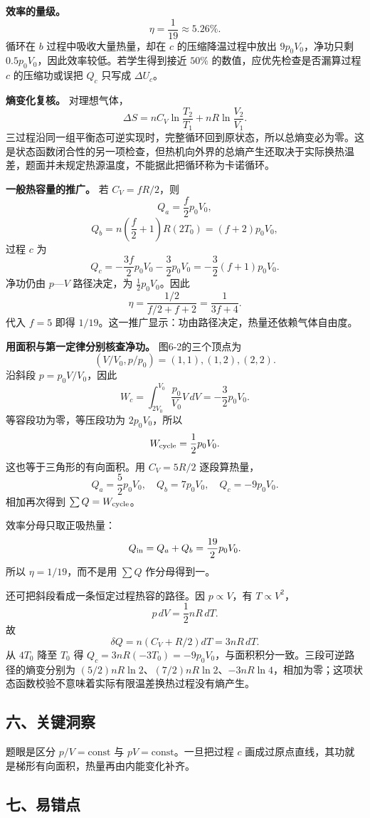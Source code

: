 \documentclass[12pt,a4paper,UTF8]{ctexart}
\begin{document}
\textbf{效率的量级。} \[
\eta=\frac1{19}\approx5.26\%.
\] 循环在 \(b\) 过程中吸收大量热量，却在 \(c\) 的压缩降温过程中放出
\(9p_0V_0\)，净功只剩 \(0.5p_0V_0\)，因此效率较低。若学生得到接近
\(50\%\) 的数值，应优先检查是否漏算过程 \(c\) 的压缩功或误把 \(Q_c\)
只写成 \(\Delta U_c\)。

\textbf{熵变化复核。} 对理想气体， \[
\Delta S=nC_V\ln\frac{T_2}{T_1}
+nR\ln\frac{V_2}{V_1}.
\]
三过程沿同一组平衡态可逆实现时，完整循环回到原状态，所以总熵变必为零。这是状态函数闭合性的另一项检查，但热机向外界的总熵产生还取决于实际换热温差，题面并未规定热源温度，不能据此把循环称为卡诺循环。

\textbf{一般热容量的推广。} 若 \(C_V=fR/2\)，则 \[
Q_a=\frac f2p_0V_0,
\] \[
Q_b=n\left(\frac f2+1\right)R(2T_0)
=(f+2)p_0V_0,
\] 过程 \(c\) 为 \[
Q_c=-\frac{3f}{2}p_0V_0-\frac32p_0V_0
=-\frac32(f+1)p_0V_0.
\] 净功仍由 \(p\)---\(V\) 路径决定，为 \(\tfrac12p_0V_0\)。因此 \[
\eta
=\frac{1/2}{f/2+f+2}
=\frac1{3f+4}.
\] 代入 \(f=5\) 即得
\(1/19\)。这一推广显示：功由路径决定，热量还依赖气体自由度。

\textbf{用面积与第一定律分别核查净功。} 图6-2的三个顶点为 \[
(V/V_0,p/p_0)=(1,1),(1,2),(2,2).
\] 沿斜段 \(p=p_0V/V_0\)，因此 \[
W_c=\int_{2V_0}^{V_0}\frac{p_0}{V_0}V\,dV=-\frac32p_0V_0.
\] 等容段功为零，等压段功为 \(2p_0V_0\)，所以 \[
W_{\rm cycle}=\frac12p_0V_0.
\] 这也等于三角形的有向面积。用 \(C_V=5R/2\) 逐段算热量， \[
Q_a=\frac52p_0V_0,\quad Q_b=7p_0V_0,\quad Q_c=-9p_0V_0.
\] 相加再次得到 \(\sum Q=W_{\rm cycle}\)。

效率分母只取正吸热量： \[
Q_{\rm in}=Q_a+Q_b=\frac{19}{2}p_0V_0.
\] 所以 \(\eta=1/19\)，而不是用 \(\sum Q\) 作分母得到一。

还可把斜段看成一条恒定过程热容的路径。因 \(p\propto V\)，有
\(T\propto V^2\)， \[
p\,dV=\frac12nR\,dT.
\] 故 \[
\delta Q=n(C_V+R/2)dT=3nR\,dT.
\] 从 \(4T_0\) 降至 \(T_0\) 得
\(Q_c=3nR(-3T_0)=-9p_0V_0\)，与面积积分一致。三段可逆路径的熵变分别为
\((5/2)nR\ln2\)、\((7/2)nR\ln2\)、\(-3nR\ln4\)，相加为零；这项状态函数校验不意味着实际有限温差换热过程没有熵产生。

\subsection{六、关键洞察}\label{ux516dux5173ux952eux6d1eux5bdf-5}

题眼是区分 \(p/V=\mathrm{const}\) 与 \(pV=\mathrm{const}\)。一旦把过程
\(c\) 画成过原点直线，其功就是梯形有向面积，热量再由内能变化补齐。

\subsection{七、易错点}\label{ux4e03ux6613ux9519ux70b9-5}
\end{document}
